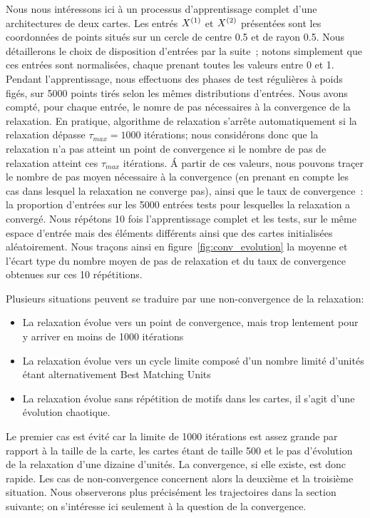 \documentclass[../main]{subfiles}
\begin{document}
Nous nous intéressons ici  à un processus d'apprentissage complet d'une architectures de deux cartes. Les entrés $X^{({1})}$ et $X^{({2})}$ présentées sont les coordonnées de points situés sur un cercle de centre 0.5 et de rayon 0.5. Nous détaillerons le choix de disposition d'entrées par la suite~; notons simplement que ces entrées sont normalisées, chaque prenant toutes les valeurs entre 0 et 1.
Pendant l'apprentissage, nous effectuons des phases de test régulières à poids figés, sur 5000 points tirés selon les mêmes distributions d'entrées. Nous avons compté, pour chaque entrée, le nomre de pas nécessaires à la convergence de la relaxation. En pratique, algorithme de relaxation s'arrête automatiquement si la relaxation dépasse $\tau_{max}= 1000$ itérations; nous considérons donc que la relaxation n'a pas atteint un point de convergence si le nombre de pas de relaxation atteint ces $\tau_{max}$ itérations. \'A partir de ces valeurs, nous pouvons traçer le nombre de pas moyen nécessaire à la convergence (en prenant en compte les cas dans lesquel la relaxation ne converge pas), ainsi que le taux de convergence~: la proportion d'entrées sur les 5000 entrées tests pour lesquelles la relaxation a convergé.
Nous répétons 10 fois l'apprentissage complet et les tests, sur le même espace d'entrée mais des éléments différents ainsi que des cartes initialisées aléatoirement.
Nous traçons ainsi en figure~\ref{fig:conv_evolution} la moyenne et l'écart type du nombre moyen de pas de relaxation et du taux de convergence obtenues sur ces 10 répétitions.

Plusieurs situations peuvent se traduire par une non-convergence de la relaxation:
\begin{itemize}
\item La relaxation évolue vers un point de convergence, mais trop lentement pour y arriver en moins de 1000 itérations
\item La relaxation évolue vers un cycle limite composé d'un nombre limité d'unités étant alternativement Best Matching Units
\item La relaxation évolue sans répétition de motifs dans les cartes, il s'agit d'une évolution chaotique.
\end{itemize}

Le premier cas est évité car la limite de 1000 itérations est assez grande par rapport à la taille de la carte, les cartes étant de taille 500 et le pas d'évolution de la relaxation d'une dizaine d'unités. 
La convergence, si elle existe, est donc rapide. Les cas de non-convergence concernent alors la deuxième et la troisième situation.
Nous observerons plus précisément les trajectoires dans la section suivante; on s'intéresse ici seulement à la question de la convergence.
\end{document}
